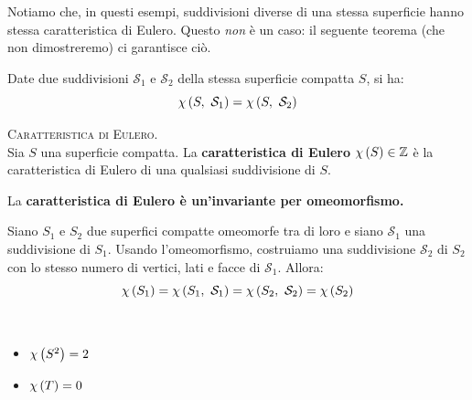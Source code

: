 Notiamo che, in questi esempi, suddivisioni diverse di una stessa superficie hanno stessa caratteristica di Eulero. Questo \textit{non} è un caso: il seguente teorema (che non dimostreremo) ci garantisce ciò.
\begin{theorema}
	Date due suddivisioni $\mathcal{S}_1$ e $\mathcal{S}_2$ della stessa superficie compatta $S$, si ha:
	\begin{equation*}
		\euler{S}{\mathcal{S}_1}=\euler{S}{\mathcal{S}_2}
	\end{equation*}
\vspace{-6mm}
\end{theorema}
\begin{define}\textsc{Caratteristica di Eulero.}\\
	Sia $S$ una superficie compatta. La \textbf{caratteristica di Eulero} $\euler{S}{\ }\in \integerset$ è la caratteristica di Eulero di una qualsiasi suddivisione di $S$.
\end{define}
\begin{corollary}
	La \textbf{caratteristica di Eulero è un'invariante per omeomorfismo.}
\end{corollary}
\begin{demonstration}
	Siano $S_1$ e $S_2$ due superfici compatte omeomorfe tra di loro e siano $\mathcal{S}_1$ una suddivisione di $S_1$. Usando l'omeomorfismo, costruiamo una suddivisione $\mathcal{S}_2$ di $S_2$ con lo stesso numero di vertici, lati e facce di $\mathcal{S}_1$. Allora:
	\begin{equation*}
		\euler{S_1}{\ }=\euler{S_1}{\mathcal{S}_1}=\euler{S_2}{\mathcal{S}_2}=\euler{S_2}{\ }
	\end{equation*}
\vspace{-3mm}
\end{demonstration}
\begin{example}~{}
	\begin{itemize}
		\item $\euler{S^2}{\ }=2$
		\item $\euler{T}{\ }=0$
	\end{itemize}
\vspace{-3mm}
\end{example}

